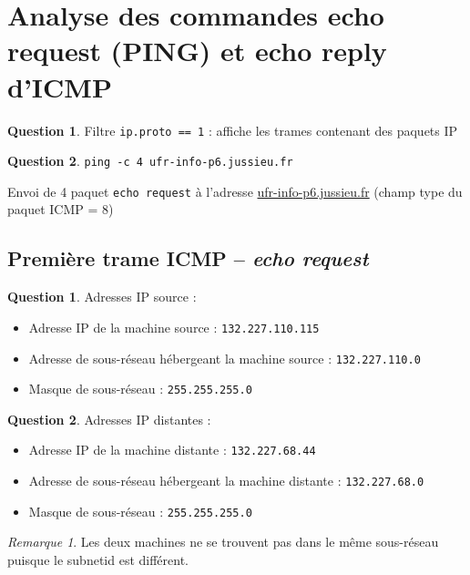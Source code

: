 \documentclass[11pt,english,french]{scrreprt}
\theoremstyle{remark}
\newtheorem*{rem*}{Remarque}
\theoremstyle{definition}
\newtheorem{ques}{Question}[section]
\newtheorem{ques*}{Question}[subsection]
\begin{document}
\section{Analyse des commandes echo request (PING) et echo reply d'ICMP} %

\begin{ques}
	Filtre \lstinline!ip.proto == 1! : affiche les trames contenant des paquets IP
\end{ques}

\begin{ques}
	\lstinline!ping -c 4 ufr-info-p6.jussieu.fr!
	
	Envoi de 4 paquet \lstinline!echo request! à l'adresse \url{ufr-info-p6.jussieu.fr} (champ type du paquet ICMP = 8)
\end{ques}

\setcounter{subsection}{2}

\subsection{Première trame ICMP -- \emph{echo request}} %

\begin{ques*}
	Adresses IP source :\begin{itemize}
		\item Adresse IP de la machine source : \lstinline!132.227.110.115!
		\item Adresse de sous-réseau hébergeant la machine source : \lstinline!132.227.110.0!
		\item Masque de sous-réseau : \lstinline!255.255.255.0!
	\end{itemize}
\end{ques*} 

\begin{ques*}
	Adresses IP distantes :\begin{itemize}
		\item Adresse IP de la machine distante : \lstinline!132.227.68.44!
		\item Adresse de sous-réseau hébergeant la machine distante : \lstinline!132.227.68.0!
		\item Masque de sous-réseau : \lstinline!255.255.255.0!
	\end{itemize}
	\begin{rem*}
		Les deux machines ne se trouvent pas dans le même sous-réseau puisque le subnetid est différent.
	\end{rem*}
\end{ques*}
\end{document}
